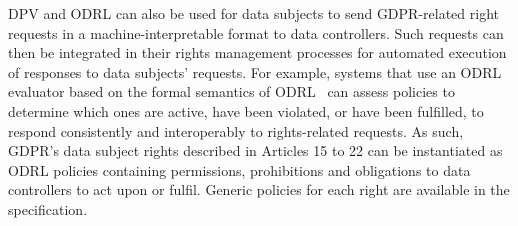 \documentclass{IOS-Book-Article}     %
\begin{document}
DPV and ODRL can also be used for data subjects to send GDPR-related right requests in a machine-interpretable format to data controllers.
Such requests can then be integrated in their rights management processes for automated execution of responses to data subjects' requests.
For example, systems that use an ODRL evaluator based on the formal semantics of ODRL~\cite{fornara_odrl_2024} can assess policies to determine which ones are active, have been violated, or have been fulfilled, to respond consistently and interoperably to rights-related requests.
As such, GDPR's data subject rights described in Articles 15 to 22 can be instantiated as ODRL policies containing permissions, prohibitions and obligations to data controllers to act upon or fulfil.
Generic policies for each right are available in the specification.




\end{document}
